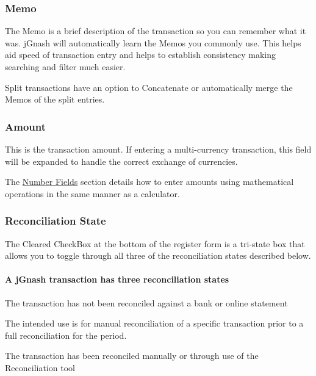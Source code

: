 \documentclass[letterpaper,12pt]{book}
\begin{document}

    \subsubsection*{Memo}
    The Memo is a brief description of the transaction so you can remember what it was.
    jGnash will automatically learn the Memos you commonly use.
    This helps aid speed of transaction entry and helps to establish consistency making searching and filter much easier.

    Split transactions have an option to Concatenate or automatically merge the Memos of the split entries.

    \subsubsection*{Amount}
    This is the transaction amount. If entering a multi-currency transaction, this field will be expanded to handle
    the correct exchange of currencies.

    The \hyperref[subsec:numberFields]{Number Fields} section details how to enter amounts using mathematical operations
    in the same manner as a calculator.

    \subsubsection*{Reconciliation State}
    The Cleared CheckBox at the bottom of the register form is a tri-state box that allows you to toggle through
    all three of the reconciliation states described below.

    \paragraph*{A jGnash transaction has three reconciliation states}
    \begin{description}[style=nextline]
        \item[Not Reconciled]
        The transaction has not been reconciled against a bank or online statement
        \item[Cleared]
        The intended use is for manual reconciliation of a specific transaction prior to a full reconciliation for the period.
        \item[Reconciled]
        The transaction has been reconciled manually or through use of the Reconciliation tool
    \end{description}
\end{document}
